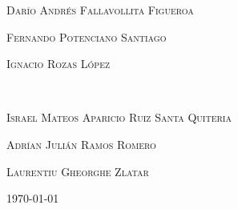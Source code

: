 \documentclass[11pt,a4paper]{article}
\begin{document}
\begin{titlepage}
	\begin{minipage}{0.4\textwidth}
		\begin{flushleft}
            \textsc{Darío Andrés Fallavollita Figueroa}
		\end{flushleft}
        \begin{flushleft}
            \textsc{Fernando Potenciano Santiago}
        \end{flushleft}
		\begin{flushleft}
		  \textsc{Ignacio Rozas López}
		\end{flushleft}
	\end{minipage}
	~
	\begin{minipage}{0.4\textwidth}
        \begin{flushright}
            \textsc{Israel Mateos Aparicio Ruiz Santa Quiteria}
		\end{flushright}
        \begin{flushright}
            \textsc{Adrían Julián Ramos Romero}
        \end{flushright}
		\begin{flushright}
		  \textsc{Laurentiu Gheorghe Zlatar}
		\end{flushright}
	\end{minipage}
	
	
	
	\vfill\vfill\vfill %
	
	{\large\today} %
	
	
	 
	
	\vfill %
	
\end{titlepage}
\end{document}
